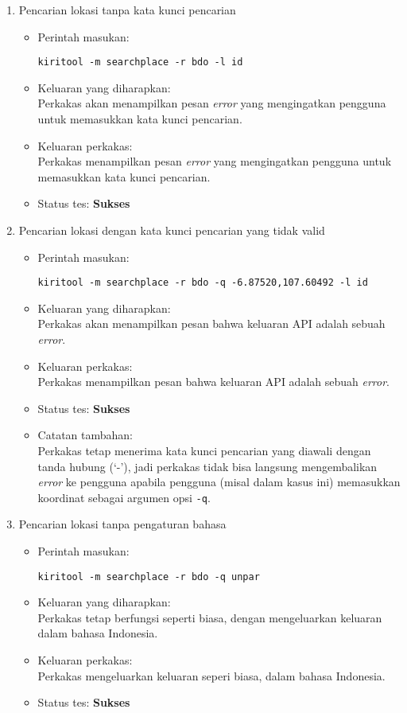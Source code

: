 \begin{enumerate}
	\item Pencarian lokasi tanpa kata kunci pencarian
	\begin{itemize}
		\item Perintah masukan:
		\begin{verbatim}
kiritool -m searchplace -r bdo -l id
		\end{verbatim}
		\item Keluaran yang diharapkan: \\
		Perkakas akan menampilkan pesan \textit{error} yang mengingatkan pengguna untuk memasukkan kata kunci pencarian.
		\item Keluaran perkakas: \\
		Perkakas menampilkan pesan \textit{error} yang mengingatkan pengguna untuk memasukkan kata kunci pencarian.
		\item Status tes: \textbf{Sukses}
	\end{itemize}
	
	\item Pencarian lokasi dengan kata kunci pencarian yang tidak valid
	\begin{itemize}
		\item Perintah masukan:
		\begin{verbatim}
kiritool -m searchplace -r bdo -q -6.87520,107.60492 -l id
		\end{verbatim}
		\item Keluaran yang diharapkan: \\
		Perkakas akan menampilkan pesan bahwa keluaran API adalah sebuah \textit{error}.
		\item Keluaran perkakas: \\
		Perkakas menampilkan pesan bahwa keluaran API adalah sebuah \textit{error}.
		\item Status tes: \textbf{Sukses}
		\item Catatan tambahan: \\
		Perkakas tetap menerima kata kunci pencarian yang diawali dengan tanda hubung (`-'), jadi perkakas tidak bisa langsung mengembalikan \textit{error} ke pengguna apabila pengguna (misal dalam kasus ini) memasukkan koordinat \latlon sebagai argumen opsi \verb|-q|.
	\end{itemize}
	
	\item Pencarian lokasi tanpa pengaturan bahasa
	\begin{itemize}
		\item Perintah masukan:
		\begin{verbatim}
kiritool -m searchplace -r bdo -q unpar
		\end{verbatim}
		\item Keluaran yang diharapkan: \\
		Perkakas tetap berfungsi seperti biasa, dengan mengeluarkan keluaran dalam bahasa Indonesia.
		\item Keluaran perkakas: \\
		Perkakas mengeluarkan keluaran seperi biasa, dalam bahasa Indonesia.
		\item Status tes: \textbf{Sukses}
	\end{itemize}
	

\end{enumerate}
